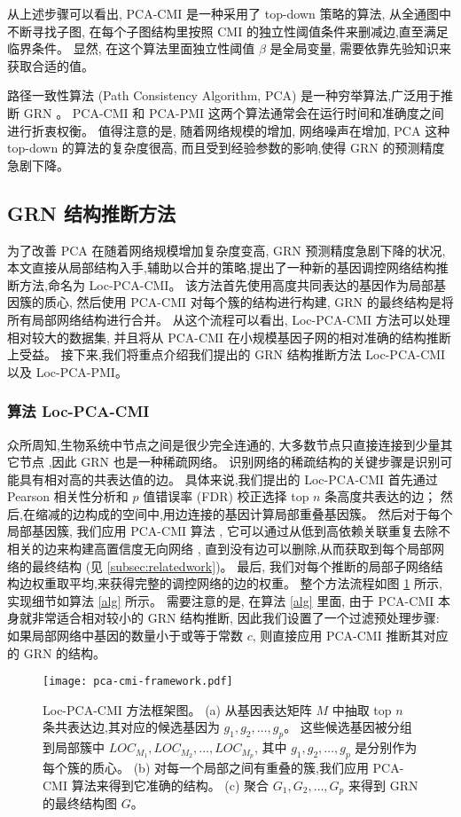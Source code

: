 从上述步骤可以看出, PCA-CMI 是一种采用了 top-down 策略的算法, 
从全通图中不断寻找子图, 在每个子图结构里按照 CMI 的独立性阈值条件来删减边,直至满足临界条件。
显然, 在这个算法里面独立性阈值 $\beta$ 是全局变量, 需要依靠先验知识来获取合适的值。

路径一致性算法 (Path Consistency Algorithm, PCA) 是一种穷举算法,广泛用于推断 GRN \cite{zhang2011inferring}。
PCA-CMI 和 PCA-PMI 这两个算法通常会在运行时间和准确度之间进行折衷权衡。
值得注意的是, 
随着网络规模的增加, 网络噪声在增加,
PCA 这种 top-down 的算法的复杂度很高, 而且受到经验参数的影响,使得 GRN 的预测精度急剧下降。

\subsection{GRN 结构推断方法}
为了改善 PCA 在随着网络规模增加复杂度变高, GRN 预测精度急剧下降的状况,本文直接从局部结构入手,辅助以合并的策略,提出了一种新的基因调控网络结构推断方法,命名为 Loc-PCA-CMI。
该方法首先使用高度共同表达的基因作为局部基因簇的质心,
然后使用 PCA-CMI 对每个簇的结构进行构建, GRN 的最终结构是将所有局部网络结构进行合并。
从这个流程可以看出, Loc-PCA-CMI 方法可以处理相对较大的数据集,
并且将从 PCA-CMI 在小规模基因子网的相对准确的结构推断上受益。
接下来,我们将重点介绍我们提出的 GRN 结构推断方法 Loc-PCA-CMI 以及 Loc-PCA-PMI。

\subsubsection{算法 Loc-PCA-CMI}

众所周知,生物系统中节点之间是很少完全连通的,
大多数节点只直接连接到少量其它节点 \cite{jeong2000large},因此 GRN 也是一种稀疏网络。
识别网络的稀疏结构的关键步骤是识别可能具有相对高的共表达值的边。
具体来说,我们提出的 Loc-PCA-CMI 首先通过 Pearson 相关性分析和 $p$ 值错误率 (FDR) 校正选择 top $n$ 条高度共表达的边；
然后,在缩减的边构成的空间中,用边连接的基因计算局部重叠基因簇。
然后对于每个局部基因簇, 我们应用 PCA-CMI 算法 \cite{zhang2011inferring},
它可以通过从低到高依赖关联重复去除不相关的边来构建高置信度无向网络 \cite{spirtes2000causation},
直到没有边可以删除,从而获取到每个局部网络的最终结构 (见 \ref{subsec:relatedwork})。
最后, 我们对每个推断的局部子网络结构边权重取平均,来获得完整的调控网络的边的权重。
整个方法流程如图 \ref{pca-cmi-fr} 所示,实现细节如算法 \ref{alg} 所示。
需要注意的是,
在算法 \ref{alg} 里面,
由于 PCA-CMI 本身就非常适合相对较小的 GRN 结构推断,
因此我们设置了一个过滤预处理步骤: 如果局部网络中基因的数量小于或等于常数 $c$,
则直接应用 PCA-CMI 推断其对应的 GRN 的结构。
\begin{figure}[!htbp]
    \centering
    \texttt{[image: pca-cmi-framework.pdf]}
    \caption{Loc-PCA-CMI 方法框架图。
    (a) 从基因表达矩阵 $M$ 中抽取 top $n$ 条共表达边,其对应的候选基因为 $g_1,g_2,\ldots,g_{p} $。
    这些候选基因被分组到局部簇中 $LOC_{M_1}, LOC_{M_2},\ldots,LOC_{M_{p}}$,
    其中 $g_1,g_2,\ldots,g_{p}$ 是分别作为每个簇的质心。
    (b) 对每一个局部之间有重叠的簇,我们应用 PCA-CMI 算法来得到它准确的结构。
    (c) 聚合 $G_1, G_2, \ldots, G_p$ 来得到 GRN 的最终结构图 $G$。
    }
    \label{pca-cmi-fr}
\end{figure}

